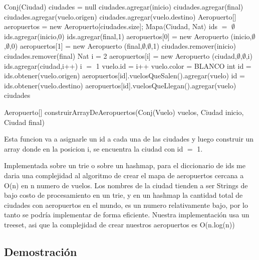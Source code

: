 \begin{algorithm}[H]
\begin{algorithmic}[1]
\STATE Conj(Ciudad) ciudades = null
\STATE ciudades.agregar(inicio)
\STATE ciudades.agregar(final)
	\STATE ciudades.agregar(vuelo.origen)
	\STATE ciudades.agregar(vuelo.destino)
\ENDFOR
\STATE Aeropuerto[] aeropuertos = new Aeropuerto[ciudades.size];
\STATE Mapa$\langle$Ciudad, Nat$\rangle$ ids $=$ $\emptyset$
\STATE ids.agregar(inicio,0)
\STATE ids.agregar(final,1)
\STATE aeropuertos[0] = new Aeropuerto (inicio,$\emptyset$,$\emptyset$,0)
\STATE aeropuertos[1] = new Aeropuerto (final,$\emptyset$,$\emptyset$,1)
\STATE ciudades.remover(inicio)
\STATE ciudades.remover(final)
\STATE Nat i = 2
	\STATE aeropuertos[i] = new Aeropuerto (ciudad,$\emptyset$,$\emptyset$,i)
	\STATE ids.agregar(ciudad,i++)
\ENDFOR
\STATE i $=$ 1
	\STATE vuelo.id = i++	
	\STATE vuelo.color = BLANCO	
	\STATE int id = ids.obtener(vuelo.origen)
	\STATE aeropuertos[id].vuelosQueSalen().agregar(vuelo)
	\STATE id = ids.obtener(vuelo.destino)
	\STATE aeropuertos[id].vuelosQueLlegan().agregar(vuelo)
\ENDFOR
\RETURN ciudades
\caption{Aeropuerto[] construirArrayDeAeropuertos(Conj(Vuelo) vuelos, Ciudad inicio, Ciudad final)}%
\end{algorithmic}
\end{algorithm}
Esta funcion va a asignarle un id a cada una de las ciudades y luego construir un array donde en la posicion i, se encuentra la ciudad con id $=$ 1.

Implementada sobre un trie o sobre un hashmap, para el diccionario de ids me daria una complejidad al algoritmo de crear el mapa de aeropuertos cercana a O(n) en n numero de vuelos. Los nombres de la ciudad tienden a ser Strings de bajo costo de procesamiento en un trie, y en un hashmap la cantidad total de ciudades con aeropuertos en el mundo, es un numero relativamente bajo, por lo tanto se podr\'ia implementar de forma eficiente.
Nuestra implementaci\'on usa un treeset, asi que la complejidad de crear nuestros aeropuertos es O(n.log(n))



\subsection{Demostración}

